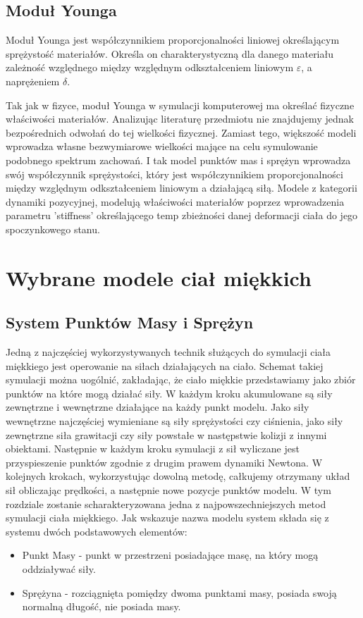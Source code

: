 \subsection{Moduł Younga}
Moduł Younga jest współczynnikiem proporcjonalności liniowej określającym
sprężystość materiałów. Określa on charakterystyczną dla danego materiału
zależność względnego między względnym odkształceniem liniowym $\varepsilon$, a
naprężeniem $\delta$.

Tak jak w fizyce, moduł Younga w symulacji komputerowej ma określać fizyczne
właściwości materiałów. Analizując literaturę przedmiotu nie znajdujemy jednak 
bezpośrednich odwołań do tej wielkości fizycznej. Zamiast tego, większość modeli wprowadza
własne bezwymiarowe wielkości mające na celu symulowanie podobnego spektrum
zachowań. I tak model punktów mas i sprężyn wprowadza swój współczynnik
sprężystości, który jest współczynnikiem proporcjonalności między względnym
odkształceniem liniowym a działającą siłą. Modele z kategorii dynamiki
pozycyjnej, modelują właściwości materiałów poprzez wprowadzenia parametru
'stiffness' określającego temp zbieżności danej deformacji ciała do jego
spoczynkowego stanu.

\section{Wybrane modele ciał miękkich}


\subsection{System Punktów Masy i Sprężyn}

Jedną z najczęściej wykorzystywanych technik służących do symulacji ciała miękkiego jest operowanie na siłach działających na ciało. Schemat takiej symulacji można uogólnić, zakładając, że ciało miękkie przedstawiamy jako zbiór punktów na które mogą działać siły. W każdym kroku akumulowane są siły zewnętrzne i wewnętrzne działające na każdy punkt modelu. Jako siły wewnętrzne najczęściej wymieniane są siły sprężystości czy ciśnienia, jako siły zewnętrzne siła grawitacji czy siły powstałe w następstwie kolizji z innymi obiektami. Następnie w każdym kroku symulacji z sił wyliczane jest przyspieszenie punktów zgodnie z drugim prawem dynamiki Newtona. W kolejnych krokach, wykorzystując dowolną metodę, całkujemy otrzymany układ sił obliczając prędkości, a następnie nowe pozycje punktów modelu.\cite{pbdyn}
W tym rozdziale zostanie scharakteryzowana jedna z najpowszechniejszych metod symulacji ciała miękkiego. Jak wskazuje nazwa modelu system składa się z systemu  dwóch podstawowych elementów:
\begin{itemize}
\item  Punkt Masy - punkt w przestrzeni posiadające masę, na który mogą oddziaływać siły.
\item Sprężyna - rozciągnięta pomiędzy dwoma punktami masy, posiada swoją normalną długość, nie posiada masy.

\end{itemize} 

